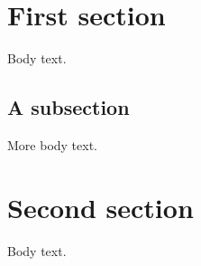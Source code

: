 \documentclass{article}
\begin{document}
\tableofcontents

\section{First section}
Body text.

\subsection{A subsection}
More body text.

\section{Second section}
Body text.
\end{document}
